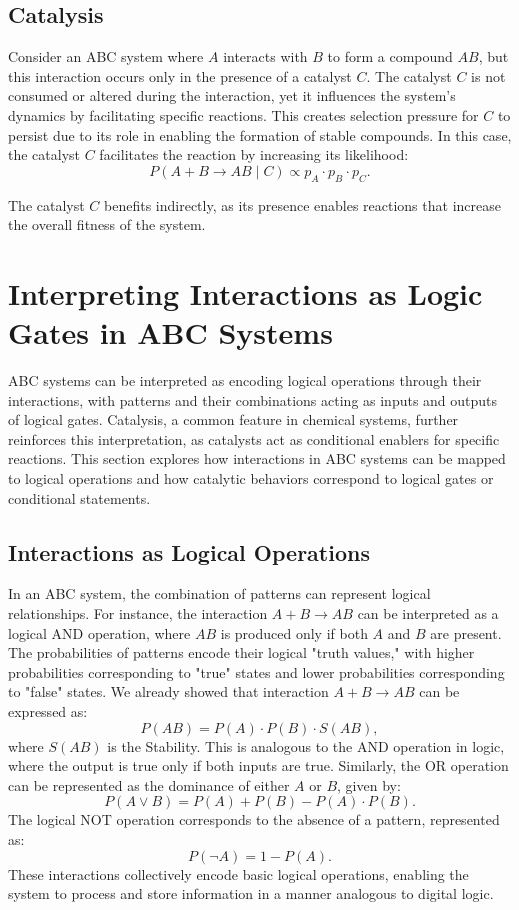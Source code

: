 \documentclass[entropy,article,submit,pdftex,moreauthors]{Definitions/mdpi}
\begin{document}
\subsection{Catalysis}

Consider an ABC system where \( A \) interacts with \( B \) to form a compound \( AB \), but this interaction occurs only in the presence of a catalyst \( C \). The catalyst \( C \) is not consumed or altered during the interaction, yet it influences the system's dynamics by facilitating specific reactions. This creates selection pressure for \( C \) to persist due to its role in enabling the formation of stable compounds. In this case, the catalyst \( C \) facilitates the reaction by increasing its likelihood:
\[
P(A + B \to AB \mid C) \propto p_A \cdot p_B \cdot p_C.
\]

The catalyst \( C \) benefits indirectly, as its presence enables reactions that increase the overall fitness of the system.

\section{Interpreting Interactions as Logic Gates in ABC Systems}

ABC systems can be interpreted as encoding logical operations through their interactions, with patterns and their combinations acting as inputs and outputs of logical gates. Catalysis, a common feature in chemical systems, further reinforces this interpretation, as catalysts act as conditional enablers for specific reactions. This section explores how interactions in ABC systems can be mapped to logical operations and how catalytic behaviors correspond to logical gates or conditional statements.

\subsection{Interactions as Logical Operations}

In an ABC system, the combination of patterns can represent logical relationships. For instance, the interaction \( A + B \to AB \) can be interpreted as a logical AND operation, where \( AB \) is produced only if both \( A \) and \( B \) are present. The probabilities of patterns encode their logical "truth values," with higher probabilities corresponding to "true" states and lower probabilities corresponding to "false" states. We already showed that interaction \( A + B \to AB \) can be expressed as:
\[
P(AB) = P(A) \cdot P(B) \cdot S(AB),
\]
where \( S(AB) \) is the Stability. This is analogous to the AND operation in logic, where the output is true only if both inputs are true. Similarly, the OR operation can be represented as the dominance of either \( A \) or \( B \), given by:
\[
P(A \lor B) = P(A) + P(B) - P(A) \cdot P(B).
\]
The logical NOT operation corresponds to the absence of a pattern, represented as:
\[
P(\neg A) = 1 - P(A).
\]
These interactions collectively encode basic logical operations, enabling the system to process and store information in a manner analogous to digital logic.
\end{document}
